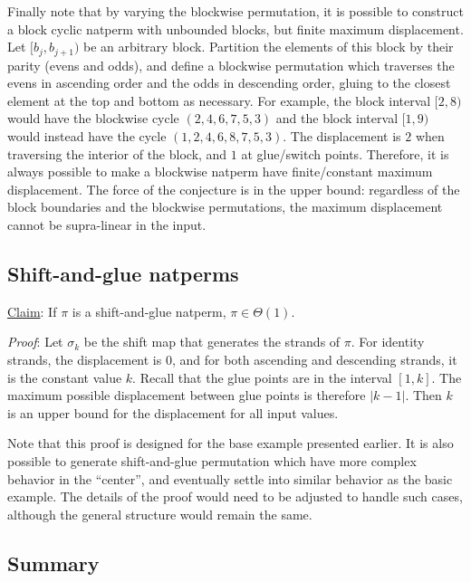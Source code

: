 \documentclass[12pt,reqno]{article}
\begin{document}
Finally note that by varying the blockwise permutation, it is possible to construct a block cyclic natperm with unbounded blocks, but finite maximum displacement. Let $[b_j, b_{j+1})$ be an arbitrary block. Partition the elements of this block by their parity (evens and odds), and define a blockwise permutation which traverses the evens in ascending order and the odds in descending order, gluing to the closest element at the top and bottom as necessary. For example, the block interval $[2, 8)$ would have the blockwise cycle $(2, 4, 6, 7, 5, 3)$ and the block interval $[1, 9)$ would instead have the cycle $(1, 2, 4, 6, 8, 7, 5, 3)$. The displacement is $2$ when traversing the interior of the block, and $1$ at glue/switch points. Therefore, it is always possible to make a blockwise natperm have finite/constant maximum displacement. The force of the conjecture is in the upper bound: regardless of the block boundaries and the blockwise permutations, the maximum displacement cannot be supra-linear in the input.

\subsection{Shift-and-glue natperms}

\underline{Claim}: If $\pi$ is a shift-and-glue natperm, $\pi \in \Theta(1)$.

\textit{Proof}: Let $\sigma_k$ be the shift map that generates the strands of $\pi$. For identity strands, the displacement is $0$, and for both ascending and descending strands, it is the constant value $k$. Recall that the glue points are in the interval $[1, k]$. The maximum possible displacement between glue points is therefore $|k - 1|$. Then $k$ is an upper bound for the displacement for all input values.

Note that this proof is designed for the base example presented earlier. It is also possible to generate shift-and-glue permutation which have more complex behavior in the ``center'', and eventually settle into similar behavior as the basic example. The details of the proof would need to be adjusted to handle such cases, although the general structure would remain the same. 

\subsection{Summary}
\end{document}
